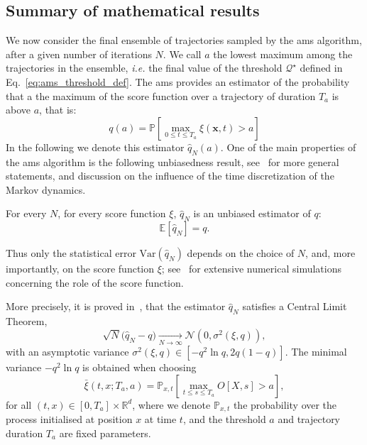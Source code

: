 \documentclass{jfm}
\begin{document}
\subsection{Summary of mathematical results}
We now consider the final ensemble of trajectories sampled by the \ac{ams} algorithm, after a given number
of iterations $N$.
We call $a$ the lowest maximum among the trajectories in the ensemble, \textit{i.e.} the final value of the threshold $\mathcal{Q}^{\star}$ defined in Eq.~\eqref{eq:ams_threshold_def}.
The \ac{ams} provides an estimator of the probability that a the maximum of the score function over a trajectory of duration $T_a$ is above $a$, that is:
\begin{equation}
\label{eq:estimator_ams}
q(a) = \mathbb{P}\left[ \underset{0\leq t \leq T_a}{\max} \xi(\mathbf{x}, t) > a \right]
\end{equation}
In the following we denote this estimator $\hat{q}_N(a)$.
One of the main properties of the \ac{ams} algorithm is the following unbiasedness result, see~\cite{brehier:hal-01142704} for more general statements, and discussion on the influence of the time discretization of the Markov dynamics.
\begin{theo}
	For every $N$, for every score function $\xi$, $\hat{q}_N$ is an unbiased estimator of $q$:
	\begin{equation}
	\mathbb{E}[\hat{q}_N]=q.
	\end{equation}
\end{theo}
Thus only the statistical error $\text{Var}(\hat{q}_N)$ depends on the choice of $N$, and, more importantly, on the score function $\xi$; see~\cite{brehier:hal-01142704,rolland_statistical_2015} for extensive numerical simulations concerning the role of the score function.

More precisely, it is proved in~\cite{Cerou2016}, that the estimator $\hat{q}_N$ satisfies a Central Limit Theorem,
\begin{equation}
\sqrt{N}\bigl(\hat{q}_N-q\bigr)\underset{N\to \infty}\to\mathcal{N}(0,\sigma^2(\xi,q)),
\end{equation}
with an asymptotic variance $\sigma^2(\xi,q)\in [-q^2\ln q,2q(1-q)]$.
The minimal variance $-q^2\ln q$ is obtained when choosing
\begin{equation}
\bar{\xi}(t,x;T_a,a)=\mathbb{P}_{x,t}\left\lbrack\underset{t\le s\le T_a}\max O[X,s] > a\right\rbrack,
\label{eq:time_dependent_committor}
\end{equation}
for all $(t,x)\in[0,T_a]\times \mathbb{R}^d$, where we denote $\mathbb{P}_{x,t}$ the probability over the process initialised at position $x$ at time $t$, and the threshold $a$ and trajectory duration $T_a$ are fixed parameters.
\end{document}
